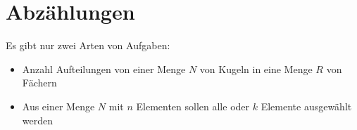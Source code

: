 \section{Abzählungen}

Es gibt nur zwei Arten von Aufgaben:

\begin{itemize}
\item Anzahl Aufteilungen von einer Menge $N$ von Kugeln in eine Menge $R$ von Fächern
\item Aus einer Menge $N$ mit $n$ Elementen sollen alle oder $k$ Elemente ausgewählt werden
\end{itemize}



